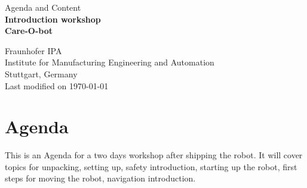 \documentclass[12pt,twoside]{report}
\begin{document}
\begin{titlepage}
\vspace*{13mm}
\begin{center}
  \vspace{10mm} 
         {\large \hspace{20mm} Agenda and Content\\}
  \vspace{10mm}
       {\Large
          \bf
          \hspace{20mm} Introduction workshop\\} 
  \vspace{5mm}
       {\Large
          \bf
          \hspace{20mm} Care-O-bot \\}

  \vspace{80mm}
  \vspace{10mm}
         {\large \hspace{20mm} Fraunhofer IPA} \\
  \vspace{5mm}
         {\large \hspace{20mm} Institute for Manufacturing Engineering and Automation} \\
         {\large \hspace{20mm} Stuttgart, Germany} \\
  \vfill
         {\large \hspace{20mm} Last modified on \today}
\end{center}
\end{titlepage}

\clearpage
\thispagestyle{empty}
\cleardoublepage
\thispagestyle{empty}\cleardoublepage %
\evensidemargin=2pt
\oddsidemargin=40pt
\renewcommand{\baselinestretch}{1.15}\normalsize
{}

\chapter{Agenda}
This is an Agenda for a two days workshop after shipping the robot. It will cover topics for unpacking, setting up, safety introduction, starting up the robot, first steps for moving the robot, navigation introduction.
\end{document}
